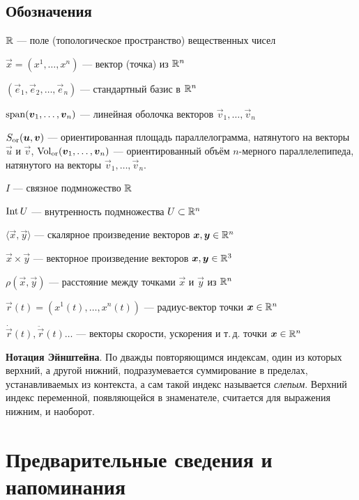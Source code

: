 \subsection*{Обозначения}

\begin{center}
\begin{minipage}{.9\textwidth}
	$\mathbb{R}$ --- поле (топологическое пространство) вещественных чисел

	$\vec{x} = (x^1, \ldots, x^n)$ --- вектор (точка) из $\mathbb{R}^n$
	
	$(\vec{e}_1, \vec{e}_2, \ldots, \vec{e}_n)$ --- стандартный базис в $\mathbb{R}^n$

	$\operatorname{span}(\boldsymbol{v}_1, \ldots, \boldsymbol{v}_n)$ --- линейная оболочка векторов $\vec{v}_1, \ldots, \vec{v}_n$

	$S_{\mathrm{or}}(\boldsymbol{u}, \boldsymbol{v})$ --- ориентированная площадь параллелограмма, натянутого на векторы $\vec{u}$ и $\vec{v}$, $\operatorname{Vol}_{\mathrm{or}}(\boldsymbol{v}_1, \ldots, \boldsymbol{v}_n)$ --- ориентированный объём $n$-мерного параллелепипеда, натянутого на векторы $\vec{v}_1, \ldots, \vec{v}_n$.

	$I$ --- связное подмножество $\mathbb{R}$

	$\operatorname{Int} U$ --- внутренность подмножества $U \subset \mathbb{R}^n$

	$\langle\vec{x}, \vec{y}\rangle$ --- скалярное произведение векторов $\boldsymbol{x}, \boldsymbol{y} \in \mathbb{R}^n$

	$\vec{x} \times \vec{y}$ --- векторное произведение векторов $\boldsymbol{x}, \boldsymbol{y} \in \mathbb{R}^3$

	$\rho(\vec{x}, \vec{y})$ --- расстояние между точками $\vec{x}$ и $\vec{y}$ из $\mathbb{R}^n$

	$\vec{r}(t) = (x^1(t), \ldots, x^n(t))$ --- радиус-вектор точки $\boldsymbol{x} \in \mathbb{R}^n$

	$\dot{\vec{r}}(t), \ddot{\vec{r}}(t) \ldots$ --- векторы скорости, ускорения и т.\,д. точки $\boldsymbol{x} \in \mathbb{R}^n$

	\medskip
	{\small\textbf{Нотация Эйнштейна}. По дважды повторяющимся индексам, один из которых верхний, а другой нижний, подразумевается суммирование в пределах, устанавливаемых из контекста, а сам такой индекс называется \textit{слепым}. Верхний индекс переменной, появляющейся в знаменателе, считается для выражения нижним, и наоборот.}
\end{minipage}
\end{center}

\section{Предварительные сведения и напоминания}

